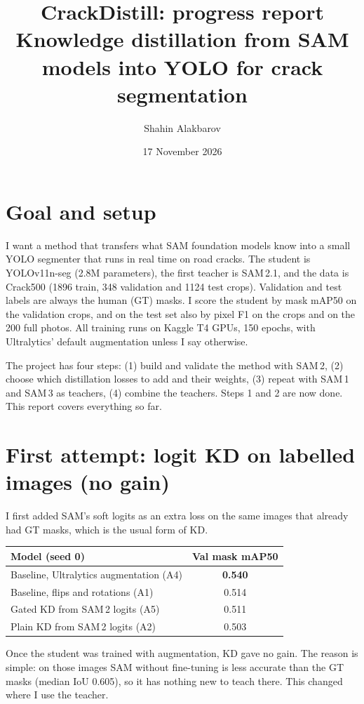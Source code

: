 \documentclass[11pt,a4paper]{article}
\title{\textbf{CrackDistill: progress report}\\\large Knowledge distillation from SAM models into YOLO for crack segmentation}
\author{Shahin Alakbarov}\date{17 November 2026}
\begin{document}
\maketitle

\section{Goal and setup}
I want a method that transfers what SAM foundation models know into a small YOLO segmenter that runs in real time on road cracks.
The student is YOLOv11n-seg (2.8M parameters), the first teacher is SAM\,2.1, and the data is Crack500
(1896 train, 348 validation and 1124 test crops). Validation and test labels are always the human (GT) masks.
I score the student by mask mAP50 on the validation crops, and on the test set also by pixel F1 on the crops and on the 200 full photos.
All training runs on Kaggle T4 GPUs, 150 epochs, with Ultralytics' default augmentation unless I say otherwise.

The project has four steps: (1) build and validate the method with SAM\,2, (2) choose which distillation losses to add and their weights,
(3) repeat with SAM\,1 and SAM\,3 as teachers, (4) combine the teachers. Steps 1 and 2 are now done. This report covers everything so far.

\section{First attempt: logit KD on labelled images (no gain)}
I first added SAM's soft logits as an extra loss on the same images that already had GT masks, which is the usual form of KD.
\begin{center}\small
\begin{tabular}{lc}
\toprule
Model (seed 0) & Val mask mAP50\\
\midrule
Baseline, Ultralytics augmentation (A4) & \textbf{0.540}\\
Baseline, flips and rotations (A1) & 0.514\\
Gated KD from SAM\,2 logits (A5) & 0.511\\
Plain KD from SAM\,2 logits (A2) & 0.503\\
\bottomrule
\end{tabular}\end{center}
Once the student was trained with augmentation, KD gave no gain. The reason is simple: on those images SAM without fine-tuning is
less accurate than the GT masks (median IoU 0.605), so it has nothing new to teach there. This changed where I use the teacher.
\end{document}
